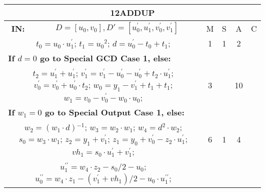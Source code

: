 \begin{tabular}{|c|cr|c|c|c|c|}
\hline
\multicolumn{7}{|c|}{\bf{12ADDUP}} \TS \\
\hline
\bf{IN:} &\multicolumn{2}{|c|}{$D = [u_0,v_0], D' = [u^{\prime}_0,u^{\prime}_1,v^{\prime}_0,v^{\prime}_1]$}
\TS & M & \hspace{1pt}S\hspace{1pt} & A & \hspace{1pt}C\hspace{1pt} \\
\hline
\multicolumn{3}{|R{340pt}|}{ 
$t_0=u_0 \cdot u^{\prime}_1$;\hspace{4pt}
$t_1=u_0{}^{2}$;\hspace{4pt}
$d=u^{\prime}_0-t_0+t_1$;\hspace{4pt}
} & 1 & 1 & 2 & \\
\multicolumn{3}{|l|}{ 
 \bf{If $d = 0$ go to Special GCD Case 1, else:} } &  &  &  & \\
\multicolumn{3}{|R{340pt}|}{ 
$t_2=u^{\prime}_1+u^{\prime}_1$;\hspace{4pt}
$v^{\prime}_1=v^{\prime}_1-u^{\prime}_0-u^{\prime}_0+t_2 \cdot u^{\prime}_1$;\hspace{4pt}
$v^{\prime}_0=v^{\prime}_0+u^{\prime}_0 \cdot t_2$;\hspace{4pt}
$w_0=y_1-v^{\prime}_1+t_1+t_1$;\hspace{4pt}
$w_1=v_0-v^{\prime}_0-w_0 \cdot u_0$;\hspace{4pt}
} & 3 &  & 10 & \\
\multicolumn{3}{|l|}{ 
 \bf{If $w_1 = 0$ go to Special Output Case 1, else:} } &  &  &  & \\
\multicolumn{3}{|R{340pt}|}{ 
$w_2=(w_1 \cdot d){}^{-1}$;\hspace{4pt}
$w_3=w_2 \cdot w_1$;\hspace{4pt}
$w_4=d{}^{2} \cdot w_2$;\hspace{4pt}
$s_0=w_3 \cdot w_1$;\hspace{4pt}
$z_2=y_1+v^{\prime}_1$;\hspace{4pt}
$z_1=y_0+v^{\prime}_0-z_2 \cdot u^{\prime}_1$;\hspace{4pt}
$vh_1=s_0 \cdot u^{\prime}_1+v^{\prime}_1$;\hspace{4pt}
} & 6 & 1 & 4 & \\
\multicolumn{3}{|R{340pt}|}{ 
$u^{\prime\prime}_1=w_4 \cdot z_2-s_0/2-u_0$;\hspace{4pt}
$u^{\prime\prime}_0=w_4 \cdot z_1-(v^{\prime}_1+vh_1)/2-u_0 \cdot u^{\prime\prime}_1$;\hspace{4pt}
}
\end{tabular}

